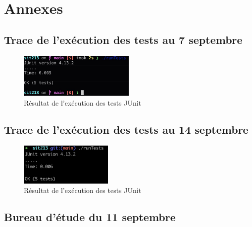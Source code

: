 \section*{Annexes}

\subsection{Trace de l'exécution des tests au 7 septembre}
\begin{figure}[H]
    \centering
    \includegraphics[width=0.5\textwidth]{img/runTests.jpg}
    \caption{Résultat de l'exécution des tests JUnit}
    \label{fig:tests1}
\end{figure}

\subsection{Trace de l'exécution des tests au 14 septembre}
\begin{figure}[H]
    \centering
    \includegraphics[width=0.4\textwidth]{img/etape2_tests_14sep.png}
    \caption{Résultat de l'exécution des tests JUnit}
    \label{fig:tests1}
\end{figure}

\subsection{Bureau d'étude du 11 septembre}

